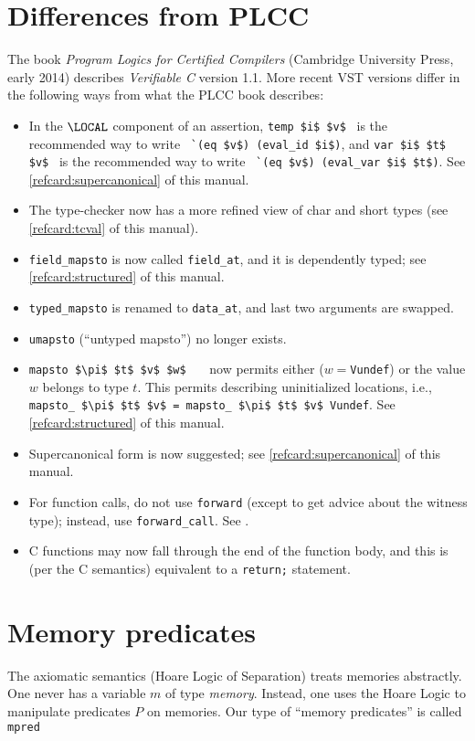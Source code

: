 \documentclass[12pt,fleqn,openany,oneside,showtrims]{memoir}
\newcommand{\ychapter}[2]{\chapter[#1]{#1 \hfill \normalsize #2}}
\begin{document}
\ychapter{Differences from PLCC}{}
The book \emph{Program Logics for Certified Compilers}
(Cambridge University Press, early 2014) describes
\emph{Verifiable C} version 1.1.  
More recent VST versions differ in the following ways
from what the PLCC book describes:
\begin{itemize}
\item In the $\LOCAL$ component of an assertion, \newline
\lstinline{temp $i$ $v$}~ is the recommended
way to write ~\lstinline{`(eq $v$) (eval_id $i$)}, 
and \newline
\lstinline{var $i$ $t$ $v$}~ is the recommended
way to write ~\lstinline{`(eq $v$) (eval_var $i$ $t$)}.
See \autoref{refcard:supercanonical} of this manual.
\item The type-checker now has a more refined view of char and short types
     (see \autoref{refcard:tcval} of this manual).
\item \lstinline{field_mapsto} is now called
\lstinline{field_at}, and it is dependently
typed; see \autoref{refcard:structured} of this manual.
\item \lstinline{typed_mapsto} is renamed to \lstinline{data_at}, and
   last two arguments are swapped.
\item \lstinline{umapsto} (``untyped mapsto'') no
longer exists.
\item \lstinline{mapsto $\pi$ $t$ $v$ $w$}
~~~now permits either ($w=$\lstinline{Vundef})
or the value $w$ belongs to type $t$.  
This permits describing uninitialized locations,
i.e., \lstinline{mapsto_ $\pi$ $t$ $v$ = mapsto_ $\pi$ $t$ $v$ Vundef}.
See \autoref{refcard:structured} of this manual.
\item Supercanonical form is now suggested; see 
\autoref{refcard:supercanonical} of this manual.
\item For function calls, do not use \lstinline{forward}
(except to get advice about the witness type);
instead, use \lstinline{forward_call}.  See .
\item C functions may now fall through the end of the function body,
and this is (per the C semantics) equivalent to a \lstinline{return;}
statement.
\end{itemize}
\ychapter{Memory predicates}{}

The axiomatic semantics (Hoare Logic of Separation) treats
memories abstractly.  One never has a variable $m$ of type
\emph{memory}.  Instead, one uses the Hoare Logic to manipulate
predicates $P$ on memories.  
Our type of ``memory predicates'' is called \lstinline{mpred}
\end{document}
